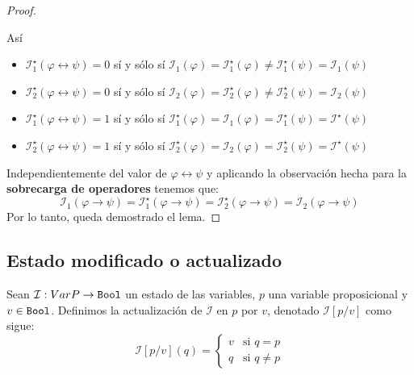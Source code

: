 \documentclass[a4paper]{article}
\begin{document}
\begin{proof}
\begin{itemize}
    \end{itemize}
    Así
    \begin{itemize}
        \item \(\mathcal{I}^{\star}_{1}\left(\varphi \leftrightarrow \psi\right) = 0\) sí y sólo sí 
        \(\mathcal{I}_{1}\left( \varphi\right) = \mathcal{I}^{\star}_{1}\left( \varphi\right) \neq 
        \mathcal{I}^{\star}_{1}\left( \psi\right) = \mathcal{I}_{1}\left( \psi\right)\)
        \item \(\mathcal{I}^{\star}_{2}\left(\varphi \leftrightarrow \psi\right) = 0\) sí y sólo sí 
        \(\mathcal{I}_{2}\left( \varphi\right) = \mathcal{I}^{\star}_{2}\left( \varphi\right) \neq 
        \mathcal{I}^{\star}_{2}\left( \psi\right) = \mathcal{I}_{2}\left( \psi\right)\)
        \item \(\mathcal{I}^{\star}_{1}\left(\varphi \leftrightarrow \psi\right) = 1\) sí y sólo sí 
        \(\mathcal{I}^{\star}_{1}\left( \varphi\right) = \mathcal{I}_{1}\left( \varphi\right) 
        = \mathcal{I}^{\star}_{1}\left( \psi\right) = \mathcal{I}^{\star}\left( \psi\right)\)
        \item \(\mathcal{I}^{\star}_{2}\left(\varphi \leftrightarrow \psi\right) = 1\) sí y sólo sí 
        \(\mathcal{I}^{\star}_{2}\left( \varphi\right) = \mathcal{I}_{2}\left( \varphi\right) 
        = \mathcal{I}^{\star}_{2}\left( \psi\right) = \mathcal{I}^{\star}\left( \psi\right)\)
    \end{itemize}
    Independientemente del valor de \(\varphi \leftrightarrow \psi\) y aplicando la observación hecha para la \textbf{sobrecarga de operadores} tenemos que:
    \[
        \mathcal{I}_{1}\left(\varphi \to \psi\right) = \mathcal{I}^{\star}_{1}\left(\varphi \to \psi\right) = \mathcal{I}^{\star}_{2}\left(\varphi \to \psi\right) = \mathcal{I}_{2}\left(\varphi \to \psi\right)
    \]
    Por lo tanto, queda demostrado el lema.
\end{proof}
\subsection{Estado modificado o actualizado}
\noindent
Sean $\mathcal{I}: VarP \to \text{\texttt{Bool}}$ un estado de las variables, $p$ una variable 
proposicional y $v \in \text{\texttt{Bool}}$. Definimos la actualización de $\mathcal{I}$ en $p$ por 
$v$, denotado $\mathcal{I}[p/v]$ como sigue:
\[
    \mathcal{I}\left[p / v\right]\left(q\right) =
    \begin{cases}
        v & \text{si } q = p \\
        q & \text{si } q \neq p
    \end{cases}
\]
\end{document}
